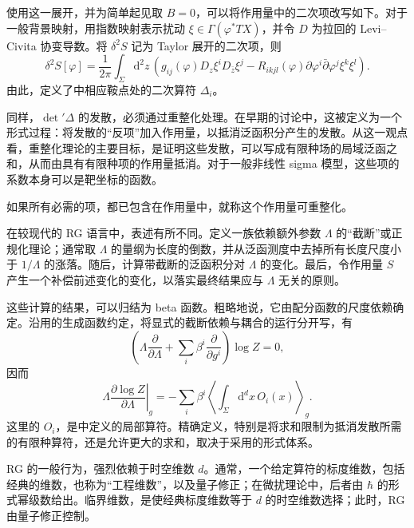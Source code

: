 使用这一展开，并为简单起见取 $B=0$，可以将作用量中的二次项改写如下。对于一般背景映射，用指数映射表示扰动 $\xi\in\Gamma(\varphi^*TX)$，并令 $D$ 为拉回的 Levi--Civita 协变导数。将 $\delta^2S$ 记为 Taylor 展开的二次项，则
\begin{equation}\label{eq:3.78}
\delta^2S[\varphi]=\frac1{2\pi}\int_\Sigma\mathrm{d}^2z\,
\left(g_{ij}(\varphi)D_z\xi^iD_{\bar z}\xi^j
-R_{ikjl}(\varphi)\partial\varphi^i\bar\partial\varphi^j
\xi^k\xi^l\right).
\end{equation}
由此，定义了中相应鞍点处的二次算符 $\Delta_i$。

同样，$\det{}'\Delta$ 的发散，必须通过重整化处理。在早期的讨论中，这被定义为一个形式过程：将发散的“反项”加入作用量，以抵消泛函积分产生的发散。从这一观点看，重整化理论的主要目标，是证明这些发散，可以写成有限种场的局域泛函之和，从而由具有有限种项的作用量抵消。对于一般非线性 sigma 模型，这些项的系数本身可以是靶坐标的函数。
\begin{definition*}\label{def:3.renormalizable-action}
如果所有必需的项，都已包含在作用量中，就称这个作用量可重整化。
\end{definition*}

在较现代的 RG 语言中，表述有所不同。定义一族依赖额外参数 $\Lambda$ 的“截断”或正规化理论；通常取 $\Lambda$ 的量纲为长度的倒数，并从泛函测度中去掉所有长度尺度小于 $1/\Lambda$ 的涨落。随后，计算带截断的泛函积分对 $\Lambda$ 的变化。最后，令作用量 $S$ 产生一个补偿前述变化的变化，以落实最终结果应与 $\Lambda$ 无关的原则。

这些计算的结果，可以归结为 beta 函数。粗略地说，它由配分函数的尺度依赖确定。沿用的生成函数约定，将显式的截断依赖与耦合的运行分开写，有
\[
\left(\Lambda\frac{\partial}{\partial\Lambda}
+\sum_i\beta^i\frac{\partial}{\partial g^i}\right)\log Z=0,
\]
因而
\[
\left.\Lambda\frac{\partial\log Z}{\partial\Lambda}\right|_g
=-\sum_i\beta^i
\left\langle\int_\Sigma\mathrm{d}^dx\,O_i(x)\right\rangle_g.
\]
这里的 $O_i$，是中定义的局部算符。精确定义，特别是将求和限制为抵消发散所需的有限种算符，还是允许更大的求和，取决于采用的形式体系。

RG 的一般行为，强烈依赖于时空维数 $d$。通常，一个给定算符的标度维数，包括经典的维数，也称为“工程维数”，以及量子修正；在微扰理论中，后者由 $\hbar$ 的形式幂级数给出。临界维数，是使经典标度维数等于 $d$ 的时空维数选择；此时，RG 由量子修正控制。

